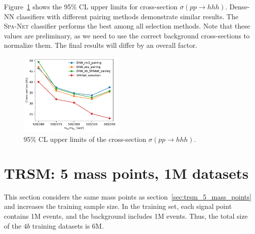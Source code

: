 \documentclass[12pt]{article}
\begin{document}
        Figure~\ref{fig:cross_section_upper_limit-TRSM-mix_5-250k-tem} shows the 95\% CL upper limits for cross-section $\sigma\left( pp \to hhh \right)$. Dense-NN classifiers with different pairing methods demonstrate similar results. The \textsc{Spa-Net} classifier performs the best among all selection methods. Note that these values are preliminary, as we need to use the correct background cross-sections to normalize them. The final results will differ by an overall factor.

        \begin{figure}[htpb]
            \centering
            \includegraphics[width=0.45\textwidth]{cross_section_upper_limit-TRSM-mix_5-250k.pdf}
            \caption{95\% CL upper limits of the cross-section $\sigma\left( pp \to hhh \right)$.}
            \label{fig:cross_section_upper_limit-TRSM-mix_5-250k-tem}
        \end{figure}
\section{TRSM: 5 mass points, 1M datasets}%
\label{sec:trsm_5_mass_points_1m_datasets}
    This section considers the same mass points as section~\ref{sec:trsm_5_mass_points} and increases the training sample size. In the training set, each signal point contains 1M events, and the background includes 1M events. Thus, the total size of the $4b$ training datasets is 6M.
\end{document}
